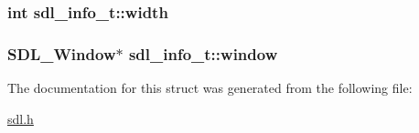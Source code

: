 \subsubsection[{\texorpdfstring{width}{width}}]{\setlength{\rightskip}{0pt plus 5cm}int sdl\+\_\+info\+\_\+t\+::width}\hypertarget{structsdl__info__t_a347a3ae7f67b70ba5542d434f7d4dc8b}{}\label{structsdl__info__t_a347a3ae7f67b70ba5542d434f7d4dc8b}
\subsubsection[{\texorpdfstring{window}{window}}]{\setlength{\rightskip}{0pt plus 5cm}S\+D\+L\+\_\+\+Window$\ast$ sdl\+\_\+info\+\_\+t\+::window}\hypertarget{structsdl__info__t_ae06510785e8d9ca03a6371aef2b908fa}{}\label{structsdl__info__t_ae06510785e8d9ca03a6371aef2b908fa}


The documentation for this struct was generated from the following file\+:\begin{DoxyCompactItemize}
\item 
\hyperlink{sdl_8h}{sdl.\+h}\end{DoxyCompactItemize}
